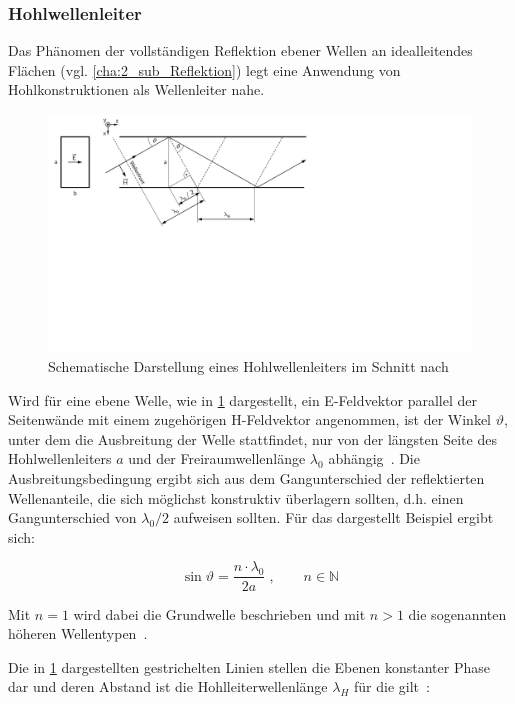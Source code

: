 \subsubsection{Hohlwellenleiter}\label{cha:2_subsub_Hohlwellenleiter}
Das Phänomen der vollständigen Reflektion ebener Wellen an idealleitendes Flächen (vgl. \Abschnitt\ref{cha:2_sub_Reflektion}) legt eine Anwendung von Hohlkonstruktionen als Wellenleiter nahe. 
\par
\vspace{\linespace}
\begin{figure}
    \centering
    \includegraphics[scale = 1, trim = 0cm 10cm 13cm 0cm, clip, width=.8\textwidth]{Abbildungen/Kapitel2/Hohlwellenleiter.pdf}
    \caption{Schematische Darstellung eines Hohlwellenleiters im Schnitt nach~\cite{Taschenbuch_HF-Technik}}
    \label{fig:2_Hohlwellenleiter}
\end{figure}

Wird für eine ebene Welle, wie in \Abb\ref{fig:2_Hohlwellenleiter} dargestellt, ein E-Feldvektor parallel der Seitenwände mit einem zugehörigen H-Feldvektor angenommen, ist der Winkel $\vartheta$, unter dem die Ausbreitung der Welle stattfindet, nur von der längsten Seite des Hohlwellenleiters $a$ und der Freiraumwellenlänge $\lambda_0$ abhängig~\cite{Taschenbuch_HF-Technik}. Die Ausbreitungsbedingung ergibt sich aus dem Gangunterschied der reflektierten Wellenanteile, die sich möglichst konstruktiv überlagern sollten, d.h. einen Gangunterschied von $\lambda_0 / 2$ aufweisen sollten. Für das dargestellt Beispiel ergibt sich: 

\begin{equation}
    \sin{\vartheta} = \frac{n \cdot \lambda_0}{2 a} \; , \qquad n \in \mathbb{N}
\end{equation}
 
Mit $n=1$ wird dabei die Grundwelle beschrieben und mit $n>1$ die sogenannten höheren Wellentypen~\cite{Taschenbuch_HF-Technik}.
\par
\vspace{\linespace}
Die in  \Abb\ref{fig:2_Hohlwellenleiter} dargestellten gestrichelten Linien stellen die Ebenen konstanter Phase dar und deren Abstand ist die Hohlleiterwellenlänge $\lambda_H$ für die gilt~\cite{Taschenbuch_HF-Technik}:


